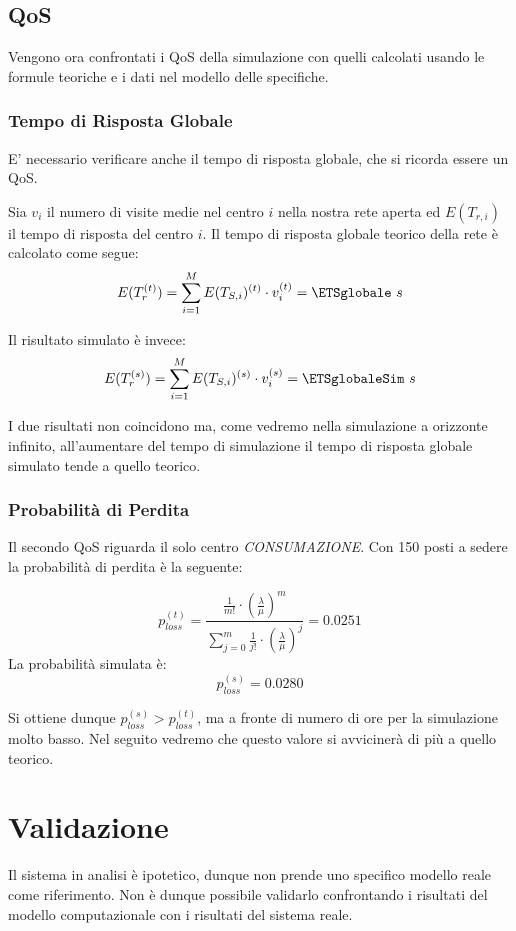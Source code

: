 \documentclass{article}
\begin{document}
\subsection{QoS}

Vengono ora confrontati i QoS della simulazione con quelli calcolati usando le formule teoriche e i dati nel modello delle specifiche.

\subsubsection{Tempo di Risposta Globale}
E' necessario verificare anche il tempo di risposta globale, che si ricorda essere un QoS. 

Sia $v_{i}$ il numero di visite medie nel centro $i$ nella nostra rete aperta ed $E(T_{r, i})$ il tempo di risposta del centro $i$. Il tempo di risposta globale teorico della rete è calcolato come segue:
\[E(T_{r}^{(t)}) = \sum_{i=1}^{M} E(T_{S,i})^{(t)} \cdot v_{i}^{(t)} = \ETSglobale\ s\] 

Il risultato simulato è invece: 
\[E(T_{r}^{(s)}) =  \sum_{i=1}^{M} E(T_{S,i})^{(s)} \cdot v_{i}^{(s)} = \ETSglobaleSim\ s\]

I due risultati non coincidono ma, come vedremo nella simulazione a orizzonte infinito, all'aumentare del tempo di simulazione il tempo di risposta globale simulato tende a quello teorico.
\subsubsection{Probabilità di Perdita}

Il secondo QoS riguarda il solo centro \textit{CONSUMAZIONE}. 
Con 150 posti a sedere la probabilità di perdita è la seguente:

\[p_{loss}^{(t)}=\frac{\frac{1}{m!} \cdot (\frac{\lambda}{\mu})^m}{\sum_{j=0}^{m}{\frac{1}{j!} \cdot (\frac{\lambda}{\mu})^j}} = 0.0251 \]
La probabilità simulata è:
\[p_{loss}^{(s)}=0.0280\]

Si ottiene dunque $p_{loss}^{(s)} > p_{loss}^{(t)}$, ma a fronte di numero di ore per la simulazione molto basso. Nel seguito vedremo che questo valore si avvicinerà di più a quello teorico.

\section{Validazione}

Il sistema in analisi è ipotetico, dunque non prende uno specifico modello reale come riferimento. Non è dunque possibile validarlo confrontando i risultati del modello computazionale con i risultati del sistema reale. 
\end{document}
